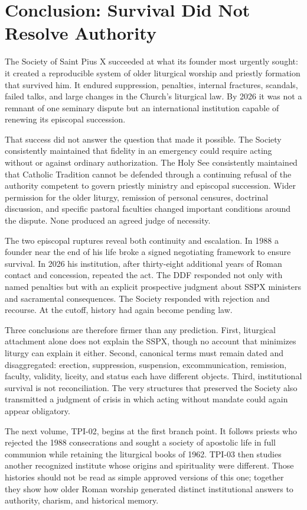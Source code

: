 \section{Conclusion: Survival Did Not Resolve Authority}

The Society of Saint Pius X succeeded at what its founder most urgently sought: it created a reproducible system of older liturgical worship and priestly formation that survived him. It endured suppression, penalties, internal fractures, scandals, failed talks, and large changes in the Church's liturgical law. By 2026 it was not a remnant of one seminary dispute but an international institution capable of renewing its episcopal succession.

That success did not answer the question that made it possible. The Society consistently maintained that fidelity in an emergency could require acting without or against ordinary authorization. The Holy See consistently maintained that Catholic Tradition cannot be defended through a continuing refusal of the authority competent to govern priestly ministry and episcopal succession. Wider permission for the older liturgy, remission of personal censures, doctrinal discussion, and specific pastoral faculties changed important conditions around the dispute. None produced an agreed judge of necessity.

The two episcopal ruptures reveal both continuity and escalation. In 1988 a founder near the end of his life broke a signed negotiating framework to ensure survival. In 2026 his institution, after thirty-eight additional years of Roman contact and concession, repeated the act. The DDF responded not only with named penalties but with an explicit prospective judgment about SSPX ministers and sacramental consequences. The Society responded with rejection and recourse. At the cutoff, history had again become pending law.

Three conclusions are therefore firmer than any prediction. First, liturgical attachment alone does not explain the SSPX, though no account that minimizes liturgy can explain it either. Second, canonical terms must remain dated and disaggregated: erection, suppression, suspension, excommunication, remission, faculty, validity, liceity, and status each have different objects. Third, institutional survival is not reconciliation. The very structures that preserved the Society also transmitted a judgment of crisis in which acting without mandate could again appear obligatory.

The next volume, TPI-02, begins at the first branch point. It follows priests who rejected the 1988 consecrations and sought a society of apostolic life in full communion while retaining the liturgical books of 1962. TPI-03 then studies another recognized institute whose origins and spirituality were different. Those histories should not be read as simple approved versions of this one; together they show how older Roman worship generated distinct institutional answers to authority, charism, and historical memory.
